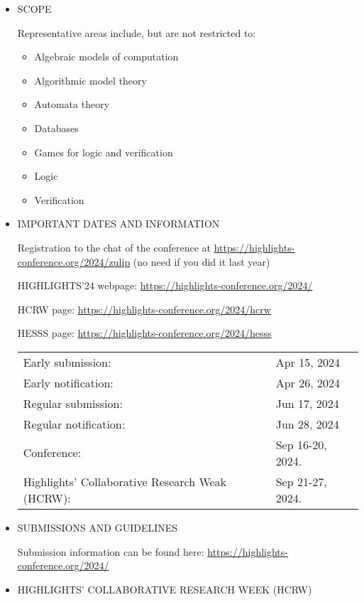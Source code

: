 \documentclass[prodmode,acmtecs]{acmsmall} %
\begin{document}
\begin{itemize}
\item  SCOPE 
 
  Representative areas include, but are not restricted to: 
 
\begin{itemize}\item  Algebraic models of computation
\item  Algorithmic model theory
\item  Automata theory
\item  Databases
\item  Games for logic and verification
\item  Logic
\item  Verification
\end{itemize} 
\item  IMPORTANT DATES AND INFORMATION 
 
  Registration to the chat of the conference at \href{https://highlights-conference.org/2024/zulip}{https://highlights-conference.org/2024/zulip} (no need if you did it last year) 
 
  HIGHLIGHTS’24 webpage: \href{https://highlights-conference.org/2024/}{https://highlights-conference.org/2024/} 
 
  HCRW page: \href{https://highlights-conference.org/2024/hcrw}{https://highlights-conference.org/2024/hcrw} 
 
  HESSS page: \href{https://highlights-conference.org/2024/hesss}{https://highlights-conference.org/2024/hesss} 
 
\begin{tabulary}{\linewidth}{LL}Early submission:  & Apr 15, 2024 \\
Early notification:  & Apr 26, 2024 \\
Regular submission:  & Jun 17, 2024 \\
Regular notification:  & Jun 28, 2024 \\
Conference:  & Sep 16-20, 2024. \\
Highlights’ Collaborative Research Weak (HCRW):  & Sep 21-27, 2024. \\
\end{tabulary}
 
\item  SUBMISSIONS AND GUIDELINES 
 
  Submission information can be found here: \href{https://highlights-conference.org/2024/}{https://highlights-conference.org/2024/} 
 
\item  HIGHLIGHTS’ COLLABORATIVE RESEARCH WEEK (HCRW) 
 

\end{itemize}
\end{document}
